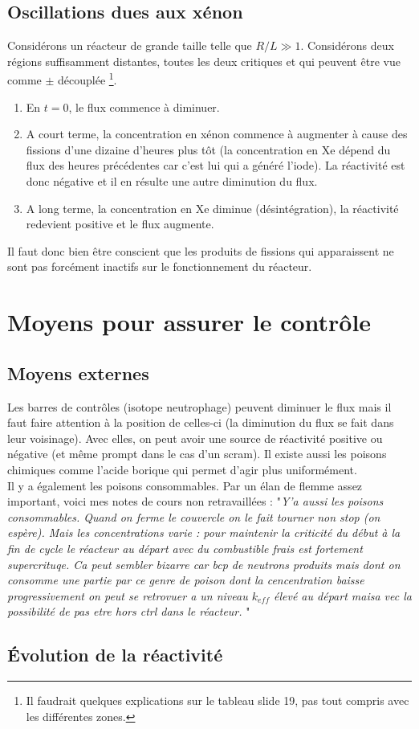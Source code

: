 	\subsection{Oscillations dues aux xénon}
	Considérons un réacteur de grande taille telle que $R/L \gg 1$. Considérons deux régions 
	suffisamment distantes, toutes les deux critiques et qui peuvent être vue comme $\pm$ découplée
	\footnote{Il faudrait quelques explications sur le tableau slide 19, pas tout compris avec les
	différentes zones.}.
	\begin{enumerate}
	\item En $t=0$, le flux commence à diminuer.
	\item A court terme, la concentration en xénon commence à augmenter à cause des fissions d'une 
	dizaine d'heures plus tôt (la concentration en Xe dépend du flux des heures précédentes car c'est
	lui qui a généré l'iode). La réactivité est donc négative et il en résulte une autre diminution 
	du flux.
	\item A long terme, la concentration en Xe diminue (désintégration), la réactivité redevient 
	positive et le flux augmente.
	\end{enumerate}
	Il faut donc bien être conscient que les produits de fissions qui apparaissent ne sont pas 
	forcément inactifs sur le fonctionnement du réacteur.
	
	
	
\section{Moyens pour assurer le contrôle}
	\subsection{Moyens externes}
	Les barres de contrôles (isotope neutrophage) peuvent diminuer le flux mais il faut faire 
	attention à la position de celles-ci (la diminution du flux se fait dans leur voisinage). Avec 
	elles, on peut avoir une source de réactivité positive ou négative (et même prompt dans le 
	cas d'un scram). Il existe aussi les poisons chimiques comme l'acide borique qui permet d'agir
	plus uniformément.\\
	
	Il y a également les poisons consommables. Par un élan de flemme assez important, voici mes notes
	de cours non retravaillées : "\textit{Y’a aussi les poisons consommables. Quand on ferme le couvercle on le fait tourner non stop (on espère). Mais les concentrations varie : pour maintenir la criticité du début à la fin de cycle le réacteur au départ avec du combustible frais est fortement supercrituqe. Ca peut sembler bizarre car bcp de neutrons produits mais dont on consomme une partie par ce genre de poison dont la cencentration baisse progressivement on peut se retrovuer a un niveau $k_{eff}$ élevé au départ maisa vec la possibilité de pas etre hors ctrl dans le réacteur. 
}"
	


	
	
	
	\subsection{Évolution de la réactivité}
	
	
		
	

